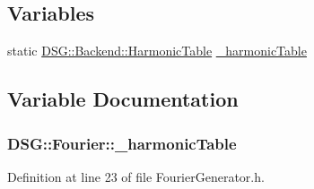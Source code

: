 \subsection*{Variables}
\begin{DoxyCompactItemize}
\item 
static \hyperlink{classDSG_1_1Backend_1_1HarmonicTable}{D\-S\-G\-::\-Backend\-::\-Harmonic\-Table} \hyperlink{namespaceDSG_1_1Fourier_a0c5e55783a8396bf8c2f8846988716db}{\-\_\-harmonic\-Table}
\end{DoxyCompactItemize}


\subsection{Variable Documentation}
\hypertarget{namespaceDSG_1_1Fourier_a0c5e55783a8396bf8c2f8846988716db}{
\subsubsection[{\-\_\-harmonic\-Table}]{ D\-S\-G\-::\-Fourier\-::\-\_\-harmonic\-Table\hspace{0.3cm}{\ttfamily [static]}}}\label{namespaceDSG_1_1Fourier_a0c5e55783a8396bf8c2f8846988716db}


Definition at line 23 of file Fourier\-Generator.\-h.

